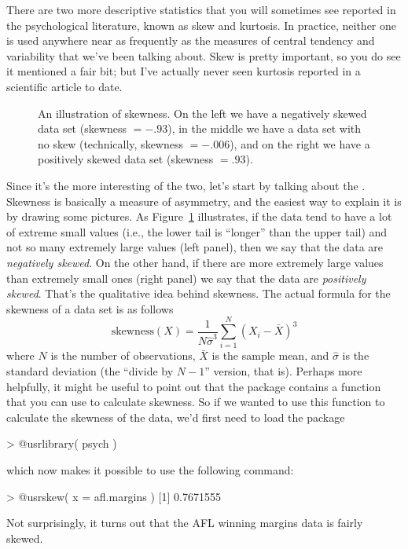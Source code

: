 There are two more descriptive statistics that you will sometimes see reported in the psychological literature, known as skew and kurtosis. In practice, neither one is used anywhere near as frequently as the measures of central tendency and variability that we've been talking about. Skew is pretty important, so you do see it mentioned a fair bit; but I've actually never seen kurtosis reported in a scientific article to date. 


\begin{figure}[t]
\begin{center}
\caption{An illustration of skewness. On the left we have a negatively skewed data set (skewness $= -.93$), in the middle we have a data set with no skew (technically, skewness $= -.006$), and on the right we have a positively skewed data set (skewness $= .93$).  }
\label{fig:skewness}
\HR
\end{center}
\end{figure}


Since it's the more interesting of the two, let's start by talking about the . Skewness is basically a measure of asymmetry, and the easiest way to explain it is by drawing some pictures. As Figure~\ref{fig:skewness} illustrates, if the data tend to have a lot of extreme small values (i.e., the lower tail is ``longer'' than the upper tail) and not so many extremely large values (left panel), then we say that the data are {\it negatively skewed}. On the other hand, if there are more extremely large values than extremely small ones (right panel) we say that the data are {\it positively skewed}. That's the qualitative idea behind skewness. The actual formula for the skewness of a data set is as follows
$$
\mbox{skewness}(X) = \frac{1}{N \hat{\sigma}^3} \sum_{i=1}^N (X_i - \bar{X})^3
$$
where $N$ is the number of observations, $\bar{X}$ is the sample mean, and $\hat{\sigma}$ is the standard deviation (the ``divide by $N-1$'' version, that is). Perhaps more helpfully, it might be useful to point out that the  package contains a  function that you can use to calculate skewness. So if we wanted to use this function to calculate the skewness of the  data, we'd first need to load the package
\begin{rblock1}
> @usr{library( psych )}
\end{rblock1}
which now makes it possible to use the following command:
\begin{rblock1}
> @usr{skew( x = afl.margins )}
[1] 0.7671555
\end{rblock1}
Not surprisingly, it turns out that the AFL winning margins data is fairly skewed.


